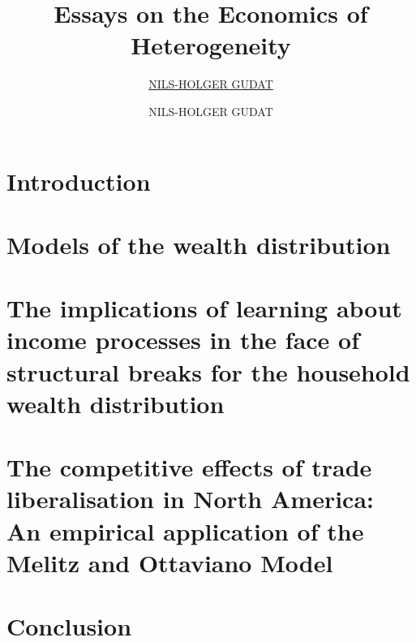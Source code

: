\documentclass[oneside,12pt,a4paper]{Classes/CUEDthesisPSnPDF}
\title{Essays on the Economics of Heterogeneity}
\author{\href{}{NILS-HOLGER GUDAT}}
\author{NILS-HOLGER GUDAT}
\theoremstyle{plain}
\begin{document}









\begin{abstractslong}

\end{abstractslong}

\setcounter{secnumdepth}{2} %

\setcounter{tocdepth}{1}

\begin{spacing}{1.3}
  \tableofcontents
\end{spacing}

\begin{spacing}{1.5}
	\listoftables
	\listoffigures
\end{spacing}

\chapter{Introduction} %


\chapter{Models of the wealth distribution} %

\chapter{The implications of learning about income processes in the face of structural breaks for the household wealth distribution} 


\chapter{The competitive effects of trade liberalisation in North America: An empirical application of the Melitz and Ottaviano Model}  %

\chapter{Conclusion} %


\begin{spacing}{1.5}


\newpage
\end{spacing}
\end{document}
